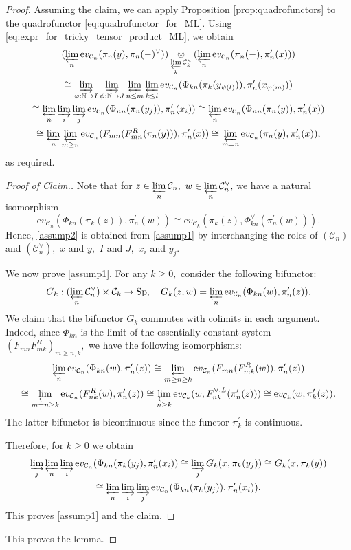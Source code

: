 \documentclass[11pt,leqno]{amsart}
\numberwithin{equation}{section}
\def\N{\mathbb{N}}
\newcommand{\tens}[1]{%
  \mathbin{\mathop{\otimes}\displaylimits_{#1}}%
}
\newcommand{\indlim}[1][]{\mathop{\varinjlim}\limits_{#1}}
\newcommand{\prolim}[1][]{\mathop{\varprojlim}\limits_{#1}}
\newcommand{\ev}{\mathrm ev}
\newcommand{\cC}{{\mathcal C}}
\newcommand{\Sp}{\operatorname{Sp}}
\begin{document}
\begin{proof}
Assuming the claim, we can apply Proposition \ref{prop:quadrofunctors} to the quadrofunctor \eqref{eq:quadrofunctor_for_ML}. Using \eqref{eq:expr_for_tricky_tensor_product_ML}, we obtain
\begin{multline*}
(\prolim[n]\ev_{\cC_n}(\pi_n(y),\pi_n(-)^{\vee}))\tens{\prolim[k]\cC_k^{\kappa}} (\prolim[n]\ev_{\cC_n}(\pi_n(-),\pi_n^\prime(x)))\\
\cong \indlim[\varphi:\N\to I]\indlim[\psi:\N\to J]\prolim[n\leq m]\prolim[k\leq l] \ev_{\cC_n}(\Phi_{kn}(\pi_k(y_{\psi(l)})),\pi_n^\prime(x_{\varphi(m)}))\\
\cong\prolim[n]\indlim[i]\indlim[j]\ev_{\cC_n}(\Phi_{nn}(\pi_n(y_j)),\pi_n^\prime(x_i))\cong \prolim[n]\ev_{\cC_n}(\Phi_{nn}(\pi_n(y)),\pi_n^\prime(x))\\
\cong \prolim[n]\prolim[m\geq n]\ev_{\cC_n}(F_{mn}(F_{mn}^R(\pi_n(y))),\pi_n^\prime(x))\cong\prolim[m=n]\ev_{\cC_n}(\pi_n(y),\pi_n^\prime(x)),
\end{multline*}
as required.

\begin{proof}[Proof of Claim.]
Note that for $z\in\prolim[n]\cC_n,$ $w\in\prolim[n]\cC_n^{\vee},$ we have a natural isomorphism
$$\ev_{\cC_n}(\Phi_{kn}(\pi_k(z)),\pi_n^\prime(w))\cong \ev_{\cC_k}(\pi_k(z),\Phi_{kn}^{\vee}(\pi_n^\prime(w))).$$
Hence, \ref{assump2} is obtained from \ref{assump1} by interchanging the roles of $(\cC_n)$ and $(\cC_n^{\vee}),$ $x$ and $y,$ $I$ and $J,$ $x_i$ and $y_j.$

We now prove \ref{assump1}. For any $k\geq 0,$ consider the following bifunctor:
$$G_k:(\prolim[n]\cC_n^{\vee})\times \cC_k\to\Sp,\quad G_k(z,w)=\prolim[n]\ev_{\cC_n}(\Phi_{kn}(w),\pi_n'(z)).$$ We claim that the bifunctor $G_k$ commutes with colimits in each argument. Indeed, since $\Phi_{kn}$ is the limit of the essentially constant system $(F_{mn}F_{mk}^R)_{m\geq n,k},$ we have the following isomorphisms:
\begin{multline*}
\prolim[n]\ev_{\cC_n}(\Phi_{kn}(w),\pi_n^\prime(z))\cong\prolim[m\geq n\geq k]\ev_{\cC_n}(F_{mn}(F_{mk}^R(w)),\pi_n^\prime(z))\\
\cong\prolim[m=n\geq k]\ev_{\cC_n}(F_{nk}^R(w),\pi_n^\prime(z))\cong \prolim[n\geq k]\ev_{\cC_k}(w,F_{nk}^{\vee,L}(\pi_n^\prime(z)))\cong\ev_{\cC_k}(w,\pi_k^\prime(z)).
\end{multline*} 
The latter bifunctor is bicontinuous since the functor $\pi_k^\prime$ is continuous.

Therefore, for $k\geq 0$ we obtain \begin{multline*}\indlim[j]\prolim[n]\indlim[i]\ev_{\cC_n}(\Phi_{kn}(\pi_k(y_j),\pi_n^\prime(x_i))\cong  \indlim[j]G_k(x,\pi_k(y_j))\cong G_k(x,\pi_k(y))\\
\cong \prolim[n]\indlim[i]\indlim[j]\ev_{\cC_n}(\Phi_{kn}(\pi_k(y_j)),\pi_n^\prime(x_i)).
\end{multline*}
This proves \ref{assump1} and the claim.
\end{proof}
This proves the lemma.
\end{proof}
\end{document}
